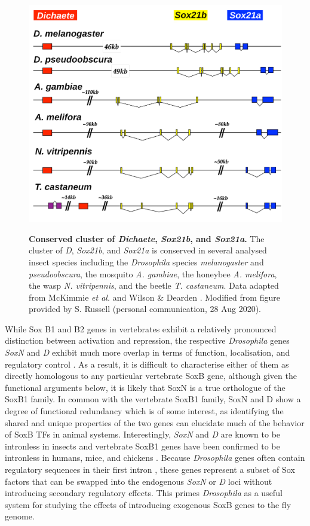 \documentclass[withindex,glossary]{cam-thesis}
\begin{document}
\setcounter{figure}{2-1}
\begin{figure}[htbp]
\centering
\includegraphics[width=.8\textwidth]{figs/Figure 2 D_Cluster.png}
\label{fig2}
\caption{\textbf{Conserved cluster of \emph{Dichaete}, \emph{Sox21b}, and \emph{Sox21a}.} The cluster of \emph{D}, \emph{Sox21b}, and \emph{Sox21a} is conserved in several analysed insect species including the \emph{Drosophila} species \emph{melanogaster} and \emph{pseudoobscura}, the mosquito \emph{A. gambiae}, the honeybee \emph{A. melifora}, the wasp \emph{N. vitripennis}, and the beetle \emph{T. castaneum}.  Data adapted from McKimmie \emph{et al.} \protect\citeyear{mckimmie_conserved_2005} and Wilson \& Dearden \protect\citeyear{wilson_evolution_2008}. Modified from figure provided by S. Russell (personal communication, 28 Aug 2020).}
\end{figure}

While Sox B1 and B2 genes in vertebrates exhibit a relatively pronounced
distinction between activation and repression, the respective
\emph{Drosophila} genes \emph{SoxN} and \emph{D} exhibit much more
overlap in terms of function, localisation, and regulatory control
. As a result, it is difficult to characterise
either of them as directly homologous to any particular vertebrate SoxB
gene, although given the functional arguments below, it is likely that
SoxN is a true orthologue of the SoxB1 family. In common with the
vertebrate SoxB1 family, SoxN and D show a degree of functional
redundancy which is of some interest, as identifying the shared and
unique properties of the two genes can elucidate much of the behavior of
SoxB TFs in animal systems. Interestingly, \emph{SoxN} and \emph{D} are
known to be intronless in insects and vertebrate SoxB1 genes have been
confirmed to be intronless in humans, mice, and chickens . Because \emph{Drosophila} genes
often contain regulatory sequences in their first intron , these genes represent a subset of Sox factors that can be swapped
into the endogenous \emph{SoxN} or \emph{D} loci without introducing
secondary regulatory effects. This primes \emph{Drosophila} as a useful
system for studying the effects of introducing exogenous SoxB genes to
the fly genome.
\end{document}
